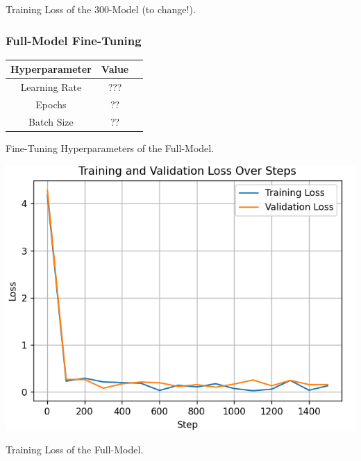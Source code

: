 \documentclass[10pt,twocolumn,letterpaper]{article}
\begin{document}
\begin{center}
    \small {Training Loss of the 300-Model (to change!).} 
\end{center}

\subsubsection*{Full-Model Fine-Tuning}

\begin{center}

    \begin{tabular}{ccc}
        \toprule
        Hyperparameter & Value \\
        \midrule
        Learning Rate & ??? \\
        Epochs & ?? \\
        Batch Size & ?? \\
        \bottomrule
    \end{tabular} 
\end{center} 

\begin{center}
    \small {Fine-Tuning Hyperparameters of the Full-Model.} 
\end{center}

\begin{center}
    \includegraphics*[scale=0.55]{img/training_loss_full.png} 
\end{center}

\begin{center}
    \small {Training Loss of the Full-Model.} 
\end{center}
\end{document}

